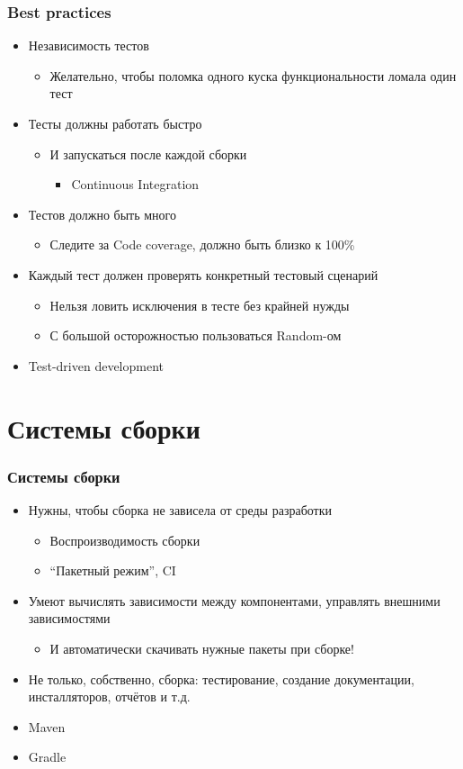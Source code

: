 \documentclass[xetex,mathserif,serif]{beamer}
\begin{document}
	\begin{frame}
		\frametitle{Best practices}
		\begin{itemize}
			\item Независимость тестов
			\begin{itemize}
				\item Желательно, чтобы поломка одного куска функциональности ломала один тест
			\end{itemize}
			\item Тесты должны работать быстро
			\begin{itemize}
				\item И запускаться после каждой сборки
				\begin{itemize}
					\item Continuous Integration
				\end{itemize}
			\end{itemize}
			\item Тестов должно быть много
			\begin{itemize}
				\item Следите за Code coverage, должно быть близко к 100\%
			\end{itemize}
			\item Каждый тест должен проверять конкретный тестовый сценарий
			\begin{itemize}
				\item Нельзя ловить исключения в тесте без крайней нужды
				\item С большой осторожностью пользоваться Random-ом
			\end{itemize}
			\item Test-driven development
		\end{itemize}
	\end{frame}

	\section{Системы сборки}

	\begin{frame}
		\frametitle{Системы сборки}
		\begin{itemize}
			\item Нужны, чтобы сборка не зависела от среды разработки
			\begin{itemize}
				\item Воспроизводимость сборки
				\item ``Пакетный режим'', CI
			\end{itemize}
			\item Умеют вычислять зависимости между компонентами, управлять внешними зависимостями
			\begin{itemize}
				\item И автоматически скачивать нужные пакеты при сборке!
			\end{itemize}
			\item Не только, собственно, сборка: тестирование, создание документации, инсталляторов, отчётов и т.д.
			\item Maven
			\item Gradle
		\end{itemize}
	\end{frame}
\end{document}
